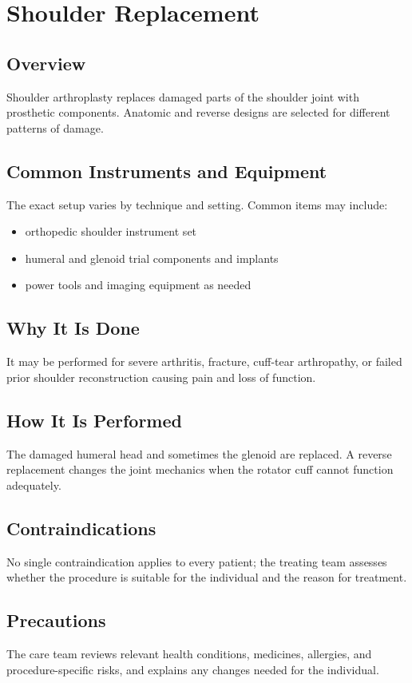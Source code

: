 \chapter{Shoulder Replacement}
\section*{Overview}
Shoulder arthroplasty replaces damaged parts of the shoulder joint with prosthetic components. Anatomic and reverse designs are selected for different patterns of damage.
\section*{Common Instruments and Equipment}
The exact setup varies by technique and setting. Common items may include:
\begin{itemize}[nosep,leftmargin=*]
  \item orthopedic shoulder instrument set
  \item humeral and glenoid trial components and implants
  \item power tools and imaging equipment as needed
\end{itemize}

\section*{Why It Is Done}
It may be performed for severe arthritis, fracture, cuff-tear arthropathy, or failed prior shoulder reconstruction causing pain and loss of function.
\section*{How It Is Performed}
The damaged humeral head and sometimes the glenoid are replaced. A reverse replacement changes the joint mechanics when the rotator cuff cannot function adequately.
\section*{Contraindications}
No single contraindication applies to every patient; the treating team assesses whether the procedure is suitable for the individual and the reason for treatment.

\section*{Precautions}
The care team reviews relevant health conditions, medicines, allergies, and procedure-specific risks, and explains any changes needed for the individual.

